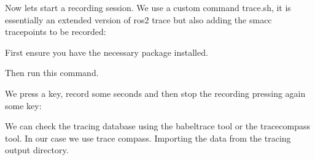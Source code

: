  Now lets start a recording session. We use a custom command {\ttfamily trace.\+sh}, it is essentially an extended version of {\ttfamily ros2 trace} but also adding the smacc tracepoints to be recorded\+:

First ensure you have the necessary package installed. 
\begin{DoxyCode}{0}

\end{DoxyCode}


Then run this command. 
\begin{DoxyCode}{0}

\end{DoxyCode}
 We press a key, record some seconds and then stop the recording pressing again some key\+:


\begin{DoxyCode}{0}

\end{DoxyCode}
 We can check the tracing database using the babeltrace tool or the tracecompass tool. In our case we use trace compass. Importing the data from the tracing output directory.

 